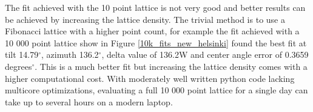 \begin{figure}[h]
\begin{floatrow}
\end{floatrow}
\end{figure}

\noindent The fit achieved with the 10 point lattice is not very good and better results can be achieved by increasing the lattice density. The trivial method is to use a Fibonacci lattice with a higher point count, for example the fit achieved with a 10 000 point lattice show in Figure \ref{10k_fits_new_helsinki} found the best fit at tilt 14.79$^\circ$, azimuth 136.2$^\circ$, delta value of 136.2W and center angle error of 0.3659 degrees$^\circ$. This is a much better fit but increasing the lattice density comes with a higher computational cost. With moderately well written python code lacking multicore optimizations, evaluating a full 10 000 point lattice for a single day can take up to several hours on a modern laptop.


